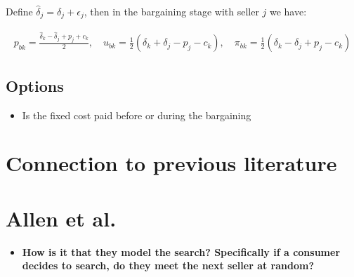 \documentclass[12pt]{article}
\theoremstyle{plain}
\theoremstyle{plain}
\begin{document}
Define $\hat{\delta}_j = \delta_j + \epsilon_j$, then in the bargaining stage with seller $j$ we have:  

\begin{align*}
    p_{bk} = \frac{\hat\delta_k - \hat\delta_j + p_j + c_k}{2} ,\quad u_{bk} = \frac{1}{2}(\delta_k + \delta_j - p_j - c_k), \quad \pi_{bk} = \frac{1}{2}(\delta_k - \delta_j + p_j - c_k)
\end{align*}

\subsection{Options}
\begin{itemize}
    \item Is the fixed cost paid before or during the bargaining
\end{itemize}


\section{Connection to previous literature}

\section{Allen et al. }
\begin{itemize}
    \item \textbf{How is it that they model the search? Specifically if a consumer decides to search, do they meet the next seller at random? }


    
\end{itemize}
\end{document}
